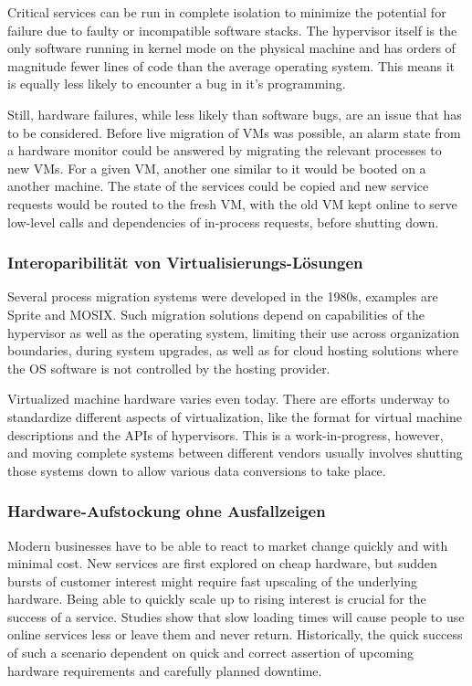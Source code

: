 \documentclass[journal]{IEEEtran}
\begin{document}
Critical services can be run in complete isolation to minimize the
potential for failure due to faulty or incompatible software
stacks. The hypervisor itself is the only software running in kernel
mode on the physical machine and has orders of magnitude fewer lines
of code than the average operating system. This means it is equally
less likely to encounter a bug in it's programming.

Still, hardware failures, while less likely than software bugs, are an
issue that has to be considered. Before live migration of VMs was
possible, an alarm state from a hardware monitor could be answered by
migrating the relevant processes to new VMs\cite{hansen2004self}. For
a given VM, another one similar to it would be booted on a another
machine. The state of the services could be copied and new service
requests would be routed to the fresh VM, with the old VM kept online
to serve low-level calls and dependencies of in-process requests,
before shutting down\cite{clark2005live}.

\subsubsection{Interoparibilität von Virtualisierungs-Lösungen}
Several process migration systems were developed in the 1980s,
examples are Sprite and MOSIX\cite{hansen2004self}. Such migration
solutions depend on capabilities of the hypervisor as well as the
operating system, limiting their use across organization boundaries,
during system upgrades, as well as for cloud hosting solutions where
the OS software is not controlled by the hosting provider.

Virtualized machine hardware varies even today. There are efforts
underway\cite{cloudstandard} to standardize different aspects of
virtualization, like the format for virtual machine descriptions and
the APIs of hypervisors. This is a work-in-progress, however, and
moving complete systems between different vendors usually involves
shutting those systems down to allow various data conversions to take
place.

\subsubsection{Hardware-Aufstockung ohne Ausfallzeigen}
Modern businesses have to be able to react to market change quickly
and with minimal cost. New services are first explored on cheap
hardware\cite{tanenbaum1992modern}, but sudden bursts of customer
interest might require fast upscaling of the underlying
hardware. Being able to quickly scale up to rising interest is crucial
for the success of a service. Studies show that slow loading times
will cause people to use online services less or leave them and never
return\cite{kohavi2007online}. Historically, the quick success of such
a scenario dependent on quick and correct assertion of upcoming
hardware requirements and carefully planned downtime.
\end{document}
